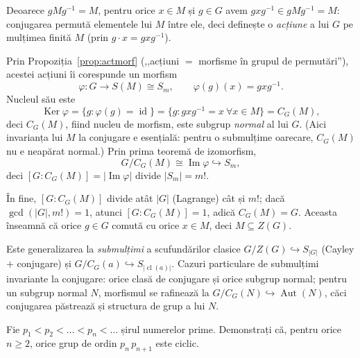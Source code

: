 \begin{solutie}
Deoarece $gMg^{-1}=M$, pentru orice $x\in M$ și $g\in G$ avem
$gxg^{-1}\in gMg^{-1}=M$: conjugarea permută elementele lui $M$
între ele, deci definește o \emph{acțiune} a lui $G$ pe
mulțimea finită $M$ (prin $g\cdot x=gxg^{-1}$).

Prin Propoziția~\ref{prop:actmorf} (,,acțiuni $=$ morfisme în grupul de
permutări''), acestei acțiuni îi corespunde un morfism
\[
  \varphi:G\to S(M)\cong S_{m},\qquad \varphi(g)(x)=gxg^{-1}.
\]
Nucleul său este
\[
  \operatorname{Ker}\varphi=\{g:\varphi(g)=\operatorname{id}\}
  =\{g:gxg^{-1}=x\ \forall x\in M\}=C_{G}(M),
\]
deci $C_{G}(M)$, fiind nucleu de morfism, este subgrup \emph{normal} al lui
$G$. (Aici invarianța lui $M$ la conjugare e esențială: pentru o
submulțime oarecare, $C_{G}(M)$ nu e neapărat normal.) Prin prima
teoremă de izomorfism,
\[
  G/C_{G}(M)\cong\operatorname{Im}\varphi\hookrightarrow S_{m},
\]
deci $[G:C_{G}(M)]=|\operatorname{Im}\varphi|$ divide $|S_{m}|=m!$.

În fine, $[G:C_{G}(M)]$ divide atât $|G|$ (Lagrange) cât și
$m!$; dacă $\gcd(|G|,m!)=1$, atunci $[G:C_{G}(M)]=1$, adică
$C_{G}(M)=G$. Aceasta înseamnă că orice $g\in G$ comută cu
orice $x\in M$, deci $M\subseteq Z(G)$.
\end{solutie}

\begin{obs}
Este generalizarea la \emph{submulțimi} a scufundărilor clasice
$G/Z(G)\hookrightarrow S_{|G|}$ (Cayley $+$ conjugare) și
$G/C_{G}(a)\hookrightarrow S_{|\operatorname{cl}(a)|}$. Cazuri particulare
de submulțimi invariante la conjugare: orice clasă de conjugare și
orice subgrup normal; pentru un subgrup normal $N$, morfismul se rafinează
la $G/C_{G}(N)\hookrightarrow\operatorname{Aut}(N)$, căci conjugarea
păstrează și structura de grup a lui $N$.
\end{obs}

\begin{problema}
Fie $p_{1}<p_{2}<\dots<p_{n}<\dots$ șirul numerelor prime. Demonstrați
că, pentru orice $n\ge 2$, orice grup de ordin $p_{n}\,p_{n+1}$ este
ciclic.
\end{problema}

